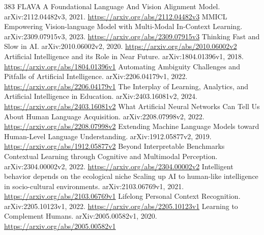 \documentclass[11pt]{article}
\begin{document}
\begin{thebibliography}{383}
 FLAVA A Foundational Language And Vision Alignment Model. arXiv:2112.04482v3, 2021. \url{https://arxiv.org/abs/2112.04482v3}
 MMICL Empowering Vision-language Model with Multi-Modal In-Context Learning. arXiv:2309.07915v3, 2023. \url{https://arxiv.org/abs/2309.07915v3}
 Thinking Fast and Slow in AI. arXiv:2010.06002v2, 2020. \url{https://arxiv.org/abs/2010.06002v2}
 Artificial Intelligence and its Role in Near Future. arXiv:1804.01396v1, 2018. \url{https://arxiv.org/abs/1804.01396v1}
 Automating Ambiguity Challenges and Pitfalls of Artificial Intelligence. arXiv:2206.04179v1, 2022. \url{https://arxiv.org/abs/2206.04179v1}
 The Interplay of Learning, Analytics, and Artificial Intelligence in Education. arXiv:2403.16081v2, 2024. \url{https://arxiv.org/abs/2403.16081v2}
 What Artificial Neural Networks Can Tell Us About Human Language Acquisition. arXiv:2208.07998v2, 2022. \url{https://arxiv.org/abs/2208.07998v2}
 Extending Machine Language Models toward Human-Level Language Understanding. arXiv:1912.05877v2, 2019. \url{https://arxiv.org/abs/1912.05877v2}
 Beyond Interpretable Benchmarks Contextual Learning through Cognitive and Multimodal Perception. arXiv:2304.00002v2, 2022. \url{https://arxiv.org/abs/2304.00002v2}
 Intelligent behavior depends on the ecological niche Scaling up AI to human-like intelligence in socio-cultural environments. arXiv:2103.06769v1, 2021. \url{https://arxiv.org/abs/2103.06769v1}
 Lifelong Personal Context Recognition. arXiv:2205.10123v1, 2022. \url{https://arxiv.org/abs/2205.10123v1}
 Learning to Complement Humans. arXiv:2005.00582v1, 2020. \url{https://arxiv.org/abs/2005.00582v1}
\end{thebibliography}
\end{document}
